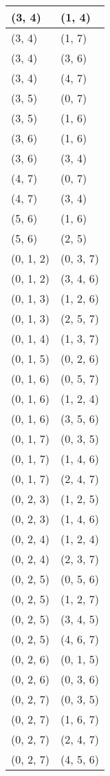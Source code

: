 \begin{footnotesize}
\begin{longtable}[c]{|l|l|}
(3, 4)
&(1, 4)
\\ \hline
(3, 4)
&(1, 7)
\\ \hline
(3, 4)
&(3, 6)
\\ \hline
(3, 4)
&(4, 7)
\\ \hline
(3, 5)
&(0, 7)
\\ \hline
(3, 5)
&(1, 6)
\\ \hline
(3, 6)
&(1, 6)
\\ \hline
(3, 6)
&(3, 4)
\\ \hline
(4, 7)
&(0, 7)
\\ \hline
(4, 7)
&(3, 4)
\\ \hline
(5, 6)
&(1, 6)
\\ \hline
(5, 6)
&(2, 5)
\\ \hline
(0, 1, 2)
&(0, 3, 7)
\\ \hline
(0, 1, 2)
&(3, 4, 6)
\\ \hline
(0, 1, 3)
&(1, 2, 6)
\\ \hline
(0, 1, 3)
&(2, 5, 7)
\\ \hline
(0, 1, 4)
&(1, 3, 7)
\\ \hline
(0, 1, 5)
&(0, 2, 6)
\\ \hline
(0, 1, 6)
&(0, 5, 7)
\\ \hline
(0, 1, 6)
&(1, 2, 4)
\\ \hline
(0, 1, 6)
&(3, 5, 6)
\\ \hline
(0, 1, 7)
&(0, 3, 5)
\\ \hline
(0, 1, 7)
&(1, 4, 6)
\\ \hline
(0, 1, 7)
&(2, 4, 7)
\\ \hline
(0, 2, 3)
&(1, 2, 5)
\\ \hline
(0, 2, 3)
&(1, 4, 6)
\\ \hline
(0, 2, 4)
&(1, 2, 4)
\\ \hline
(0, 2, 4)
&(2, 3, 7)
\\ \hline
(0, 2, 5)
&(0, 5, 6)
\\ \hline
(0, 2, 5)
&(1, 2, 7)
\\ \hline
(0, 2, 5)
&(3, 4, 5)
\\ \hline
(0, 2, 5)
&(4, 6, 7)
\\ \hline
(0, 2, 6)
&(0, 1, 5)
\\ \hline
(0, 2, 6)
&(0, 3, 6)
\\ \hline
(0, 2, 7)
&(0, 3, 5)
\\ \hline
(0, 2, 7)
&(1, 6, 7)
\\ \hline
(0, 2, 7)
&(2, 4, 7)
\\ \hline
(0, 2, 7)
&(4, 5, 6)
\\ \hline

\end{longtable}
\end{footnotesize}
